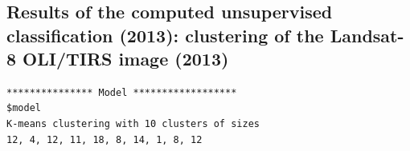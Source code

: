 \documentclass[knowledge,article,submit,pdftex,moreauthors]{Definitions/mdpi}
\begin{document}
\appendixstart
\appendix
\section[\appendixname~\thesection]{}
\subsection[\appendixname~\thesubsection]{Results of the computed unsupervised classification (2013): clustering of the Landsat-8 OLI/TIRS image (2013)}

\begin{small}
\begin{verbatim}
*************** Model ******************
$model
K-means clustering with 10 clusters of sizes 
12, 4, 12, 11, 18, 8, 14, 1, 8, 12


\end{verbatim}
\end{small}
\end{document}
